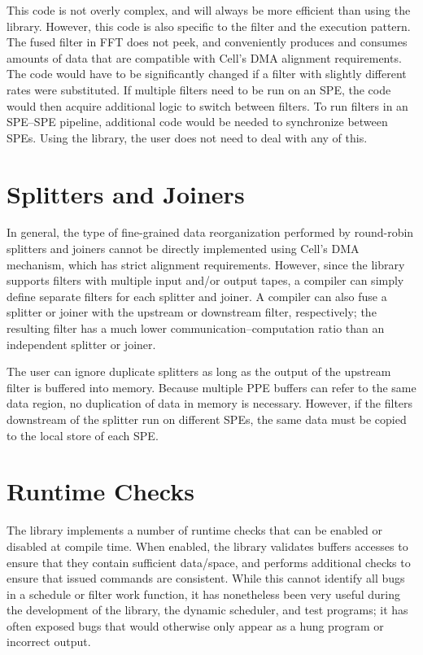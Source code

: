 This code is not overly complex, and will always be more efficient than using the library. However, this code is also specific to the filter and the execution pattern. The fused filter in FFT does not peek, and conveniently produces and consumes amounts of data that are compatible with Cell's DMA alignment requirements. The code would have to be significantly changed if a filter with slightly different rates were substituted. If multiple filters need to be run on an SPE, the code would then acquire additional logic to switch between filters. To run filters in an SPE--SPE pipeline, additional code would be needed to synchronize between SPEs. Using the library, the user does not need to deal with any of this.

\section{Splitters and Joiners}

In general, the type of fine-grained data reorganization performed by round-robin splitters and joiners cannot be directly implemented using Cell's DMA mechanism, which has strict alignment requirements. However, since the library supports filters with multiple input and/or output tapes, a compiler can simply define separate filters for each splitter and joiner. A compiler can also fuse a splitter or joiner with the upstream or downstream filter, respectively; the resulting filter has a much lower communication--computation ratio than an independent splitter or joiner.

The user can ignore duplicate splitters as long as the output of the upstream filter is buffered into memory. Because multiple PPE buffers can refer to the same data region, no duplication of data in memory is necessary. However, if the filters downstream of the splitter run on different SPEs, the same data must be copied to the local store of each SPE.

\section{Runtime Checks}

The library implements a number of runtime checks that can be enabled or disabled at compile time. When enabled, the library validates buffers accesses to ensure that they contain sufficient data/space, and performs additional checks to ensure that issued commands are consistent. While this cannot identify all bugs in a schedule or filter work function, it has nonetheless been very useful during the development of the library, the dynamic scheduler, and test programs; it has often exposed bugs that would otherwise only appear as a hung program or incorrect output.

